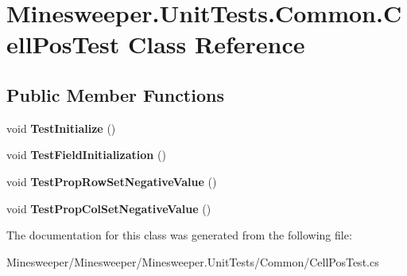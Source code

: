 \hypertarget{class_minesweeper_1_1_unit_tests_1_1_common_1_1_cell_pos_test}{\section{Minesweeper.\+Unit\+Tests.\+Common.\+Cell\+Pos\+Test Class Reference}
\label{class_minesweeper_1_1_unit_tests_1_1_common_1_1_cell_pos_test}
}
\subsection*{Public Member Functions}
\begin{DoxyCompactItemize}
\item 
\hypertarget{class_minesweeper_1_1_unit_tests_1_1_common_1_1_cell_pos_test_a704f4597ba775711ac847859e4e26102}{void {\bfseries Test\+Initialize} ()}\label{class_minesweeper_1_1_unit_tests_1_1_common_1_1_cell_pos_test_a704f4597ba775711ac847859e4e26102}

\item 
\hypertarget{class_minesweeper_1_1_unit_tests_1_1_common_1_1_cell_pos_test_a86b4b409ca594fec6c5db941bf0b1c8d}{void {\bfseries Test\+Field\+Initialization} ()}\label{class_minesweeper_1_1_unit_tests_1_1_common_1_1_cell_pos_test_a86b4b409ca594fec6c5db941bf0b1c8d}

\item 
\hypertarget{class_minesweeper_1_1_unit_tests_1_1_common_1_1_cell_pos_test_add27578158ad507d72a7a0bcffbb4738}{void {\bfseries Test\+Prop\+Row\+Set\+Negative\+Value} ()}\label{class_minesweeper_1_1_unit_tests_1_1_common_1_1_cell_pos_test_add27578158ad507d72a7a0bcffbb4738}

\item 
\hypertarget{class_minesweeper_1_1_unit_tests_1_1_common_1_1_cell_pos_test_aa38b31c679ca3dd76ce6323d8e04c3c5}{void {\bfseries Test\+Prop\+Col\+Set\+Negative\+Value} ()}\label{class_minesweeper_1_1_unit_tests_1_1_common_1_1_cell_pos_test_aa38b31c679ca3dd76ce6323d8e04c3c5}

\end{DoxyCompactItemize}


The documentation for this class was generated from the following file\+:\begin{DoxyCompactItemize}
\item 
Minesweeper/\+Minesweeper/\+Minesweeper.\+Unit\+Tests/\+Common/Cell\+Pos\+Test.\+cs\end{DoxyCompactItemize}
